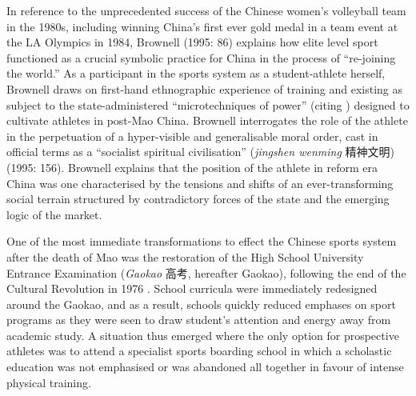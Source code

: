{In reference to the unprecedented success of the Chinese women’s volleyball team in the 1980s, including winning China's first ever gold medal in a team event at the LA Olympics in 1984, Brownell (1995: 86) explains how elite level sport functioned as a crucial symbolic practice for China in the process of ``re-joining the world.''  As a participant in the sports system as a student-athlete herself, Brownell draws on first-hand ethnographic experience of training and existing as subject to the state-administered ``microtechniques of power'' (citing \cite{Foucault1977}) designed to cultivate athletes in post-Mao China.  Brownell interrogates the role of the athlete in the perpetuation of a hyper-visible and generalisable moral order, cast in official terms as a ``socialist spiritual civilisation'' (\textit{jingshen wenming} 精神文明) (1995: 156).  Brownell explains that the position of the athlete in reform era China was one characterised by the tensions and shifts of an ever-transforming social terrain structured by contradictory forces of the state and the emerging logic of the market.

One of the most immediate transformations to effect the Chinese sports system after the death of Mao was the restoration of the High School University Entrance Examination (\textit{Gaokao} 高考, hereafter Gaokao), following the end of the Cultural Revolution in 1976 \citep[198]{Brownell1995}.  School curricula were immediately redesigned around the Gaokao, and as a result, schools quickly reduced emphases on sport programs as they were seen to draw student’s attention and energy away from academic study.  A situation thus emerged where the only option for prospective athletes was to attend a specialist sports boarding school in which a scholastic education was not emphasised or was abandoned all together in favour of intense physical training.

}
